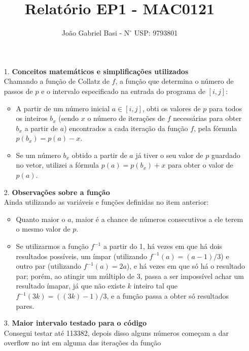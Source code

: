 \documentclass[12pt, a4paper]{article} %
\title{Relatório EP1 - MAC0121}
\date{}
\author{João Gabriel Basi - $\text{N}^\circ$ USP: 9793801}
\begin{document}
\maketitle
\begin{enumerate}
\large
\item[1.]\textbf{Conceitos matemáticos e simplificações utilizados}
\normalsize\\
Chamando a função de Collatz de $f$, a função que determina o número de passos de $p$ e o intervalo especificado na entrada do programa de $[i,j]$:
\begin{itemize}
\item A partir de um número inicial $a\in[i,j]$, obti os valores de $p$ para todos os inteiros $b_x$ (sendo $x$ o número de iterações de $f$ necessárias para obter $b_x$ a partir de $a$) encontrados a cada iteração da função $f$, pela fórmula $p(b_x) = p(a) - x$.
\item Se um número $b_x$ obtido a partir de $a$ já tiver o seu valor de $p$ guardado no vetor, utilizei a fórmula $p(a) = p(b_x) + x$ para obter o valor de $p(a)$.
\end{itemize}
\large
\item[2.]\textbf{Observações sobre a função}
\normalsize\\
Ainda utilizando as variáveis e funções definidas no item anterior:
\begin{itemize}
\item Quanto maior o $a$, maior é a chance de números consecutivos a ele terem o mesmo valor de $p$.
\item Se utilizarmos a função $f^{-1}$ a partir do 1, há vezes em que há dois resultados possíveis, um ímpar (utilizando $f^{-1}(a) = (a-1)/3$) e outro par (utilizando $f^{-1}(a) = 2a$), e há vezes em que só há o resultado par; porém, ao atingir um múltiplo de $3$, passa a ser impossível achar um resultado ímapar, já que não existe $k$ inteiro tal que $f^{-1}(3k) = ((3k)-1)/3$, e a função passa a obter só resultados pares.
\end{itemize}
\large
\item[3.]\textbf{Maior intervalo testado para o código}
\normalsize\\
Consegui testar até 113382, depois disso alguns números começam a dar overflow no int em alguma das iterações da função
\end{enumerate}
\end{document}
